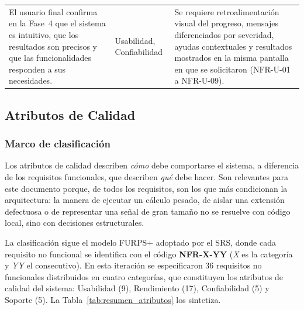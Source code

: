 \documentclass[11pt,a4paper]{article}
\DeclareRobustCommand{\_}{\textunderscore\allowbreak}
\begin{document}
\begin{longtable}{@{}>{\raggedright\arraybackslash}p{5.2cm}
                  >{\raggedright\arraybackslash}p{2.6cm}
                  >{\raggedright\arraybackslash}p{6.9cm}@{}}
El usuario final confirma en la Fase~4 que el sistema es intuitivo, que los resultados son precisos y que las funcionalidades responden a sus necesidades.
&
Usabilidad, Confiabilidad
&
Se requiere retroalimentación visual del progreso, mensajes diferenciados por severidad, ayudas contextuales y resultados mostrados en la misma pantalla en que se solicitaron (NFR-U-01 a NFR-U-09).
\\

\end{longtable}

\subsection{Atributos de Calidad}
\label{sec:atributos_calidad}

\subsubsection{Marco de clasificación}

Los atributos de calidad describen \textit{cómo} debe comportarse el sistema, a diferencia de los requisitos funcionales, que describen \textit{qué} debe hacer. Son relevantes para este documento porque, de todos los requisitos, son los que más condicionan la arquitectura: la manera de ejecutar un cálculo pesado, de aislar una extensión defectuosa o de representar una señal de gran tamaño no se resuelve con código local, sino con decisiones estructurales.

La clasificación sigue el modelo FURPS+ \cite{eeles2001} adoptado por el SRS, donde cada requisito no funcional se identifica con el código \textbf{NFR-X-YY} (\textit{X} es la categoría y \textit{YY} el consecutivo). En esta iteración se especificaron 36 requisitos no funcionales distribuidos en cuatro categorías, que constituyen los atributos de calidad del sistema: Usabilidad (9), Rendimiento (17), Confiabilidad (5) y Soporte (5). La Tabla~\ref{tab:resumen_atributos} los sintetiza.
\end{document}
